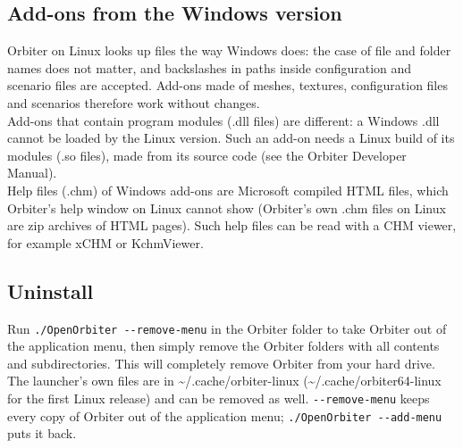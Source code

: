 \documentclass[Orbiter User Manual.tex]{subfiles}
\begin{document}
\subsection{Add-ons from the Windows version}
Orbiter on Linux looks up files the way Windows does: the case of file and folder names does not matter, and backslashes in paths inside configuration and scenario files are accepted. Add-ons made of meshes, textures, configuration files and scenarios therefore work without changes.\\
Add-ons that contain program modules (.dll files) are different: a Windows .dll cannot be loaded by the Linux version. Such an add-on needs a Linux build of its modules (.so files), made from its source code (see the Orbiter Developer Manual).\\
Help files (.chm) of Windows add-ons are Microsoft compiled HTML files, which Orbiter's help window on Linux cannot show (Orbiter's own .chm files on Linux are zip archives of HTML pages). Such help files can be read with a CHM viewer, for example xCHM or KchmViewer.

\subsection{Uninstall}
Run \texttt{./OpenOrbiter -{}-remove-menu} in the Orbiter folder to take Orbiter out of the application menu, then simply remove the Orbiter folders with all contents and subdirectories. This will completely remove Orbiter from your hard drive. The launcher's own files are in \textasciitilde/.cache/orbiter-linux (\textasciitilde/.cache/orbiter64-linux for the first Linux release) and can be removed as well. \texttt{-{}-remove-menu} keeps every copy of Orbiter out of the application menu; \texttt{./OpenOrbiter -{}-add-menu} puts it back.
\end{document}
